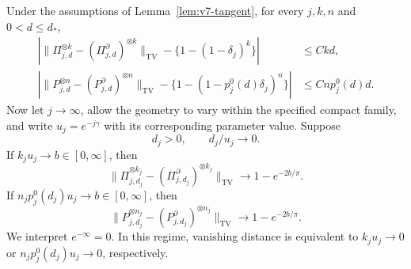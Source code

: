 \begin{theorem}
\label{thm:v7-phase}
Under the assumptions of Lemma~\ref{lem:v7-tangent}, for every $j,k,n$ and $0<d\le d_*$,
\begin{align}
 \left|\|\Pi_{j,d}^{\otimes k}-(\Pi^\partial_{j,d})^{\otimes k}\|_{\mathrm{TV}}
       -\{1-(1-\delta_j)^k\}\right|&\le Ckd,
                                                   \label{eq:v7-selected-error}\\
 \left|\|P_{j,d}^{\otimes n}-(P^\partial_{j,d})^{\otimes n}\|_{\mathrm{TV}}
       -\{1-(1-p_j^0(d)\delta_j)^n\}\right|&\le Cnp_j^0(d)d.
                                                   \label{eq:v7-raw-error}
\end{align}
Now let $j\to\infty$, allow the geometry to vary within the specified compact family, and write $u_j=e^{-j\gamma}$ with its corresponding parameter value. Suppose
\begin{equation}\label{eq:v7-joint-regime}
                         d_j>0,\qquad d_j/u_j\longrightarrow0.
\end{equation}
If $k_ju_j\to b\in[0,\infty]$, then
\begin{equation}\label{eq:v7-selected-phase}
 \|\Pi_{j,d_j}^{\otimes k_j}-(\Pi^\partial_{j,d_j})^{\otimes k_j}\|_{\mathrm{TV}}
                    \longrightarrow 1-e^{-2b/\pi}.
\end{equation}
If $n_jp_j^0(d_j)u_j\to b\in[0,\infty]$, then
\begin{equation}\label{eq:v7-raw-phase}
 \|P_{j,d_j}^{\otimes n_j}-(P^\partial_{j,d_j})^{\otimes n_j}\|_{\mathrm{TV}}
                    \longrightarrow 1-e^{-2b/\pi}.
\end{equation}
We interpret $e^{-\infty}=0$. In this regime, vanishing distance is equivalent to $k_ju_j\to0$ or $n_jp_j^0(d_j)u_j\to0$, respectively.
\end{theorem}
